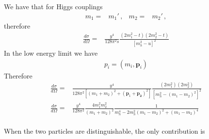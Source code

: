 We have that for Higgs couplings
\begin{align}
  m_1=&m_1'\,,&m_2=&m_2'\,,
\end{align}
therefore
\begin{align}
    \frac{d\sigma}{d\Omega}
=&\frac{y^4}{128\pi^2s}
  \frac{ \left(2m_1^2-t  \right)\left( 2m_2^2-t \right)}{\left[m^2_h -u\right]^2}
\end{align}
In the low energy limit we have
\begin{align}
  p_i=\left(m_i,\mathbf{p}_i  \right)
\end{align}
Therefore
\begin{align}
  \frac{d\sigma}{d\Omega}=&\frac{y^4}{128 \pi^2 \left[ \left(m_1+m_2 \right)^2+\left( \mathbf{p}_1+\mathbf{p_2} \right)^2 \right]}\frac{\left( 2m_1^2 \right)\left( 2m_2^2 \right)}{
\left[ m_h^2-\left(m_1-m_2  \right)^2 \right]^2} \nonumber\\
  \frac{d\sigma}{d\Omega}=&\frac{y^4}{128 \pi^2 }\frac{4m_1^2m_2^2}{\left(m_1+m_2 \right)^2}\frac{1}{
 m_h^4-2m_h^{2}\left(m_1-m_2  \right)^2+\left(m_1-m_2  \right)^4 } \nonumber\\
\end{align}

When the two particles are distinguishable, the only contribution is

